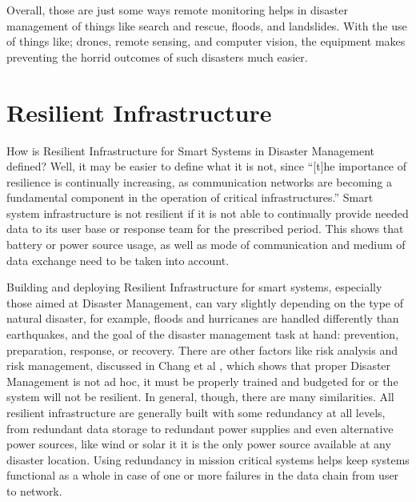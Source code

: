 \documentclass[conference]{IEEEtran}
\begin{document}
Overall, those are just some ways remote monitoring helps in disaster management of things like search 
and rescue, floods, and landslides. With the use of things like; drones, remote sensing, and computer 
vision, the equipment makes preventing the horrid outcomes of such disasters much easier.\par

\section{Resilient Infrastructure} %


How is Resilient Infrastructure for Smart Systems in Disaster Management defined? Well, it may be
easier to define what it is not, since ``[t]he importance of resilience is continually increasing, as 
communication networks are becoming a fundamental component in the operation of critical 
infrastructures.'' \cite{jm1} Smart system infrastructure is not resilient if it is not able 
to continually provide needed data to its user base or response team for the prescribed period. 
This shows that battery or power source usage, as well as mode of communication and 
medium of data exchange need to be taken into account. \par

Building and deploying Resilient Infrastructure for smart systems, especially those aimed at Disaster
Management, can vary slightly depending on the type of natural disaster, for example, floods and 
hurricanes are handled differently than earthquakes, and the goal of the disaster management
task at hand: prevention, preparation, response, or recovery. There are other factors like 
risk analysis and risk management, discussed in Chang et al \cite{jm6}, which shows that proper 
Disaster Management is not ad hoc, it must be properly trained and budgeted for or the system 
will not be resilient. In general, though, there are many similarities. All resilient infrastructure 
are generally built with some redundancy at all levels, from redundant data storage to redundant
power supplies and even alternative power sources, like wind or solar it it is the only power
source available at any disaster location. Using redundancy in mission critical systems 
helps keep systems functional as a whole in case of one or more failures in the data chain from 
user to network.\par
\end{document}

